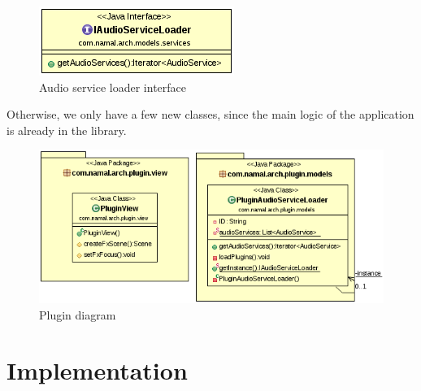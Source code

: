 \documentclass{report}
\begin{document}
{\begin{center}
\begin{figure}[H]
  \includegraphics[scale=0.4]{class/AudioServiceLoader.png}
  \caption{Audio service loader interface}
  \label{AudioServiceLoader}
\end{figure}
\end{center}

Otherwise, we only have a few new classes, since the main logic of the application is already in the library. 

\begin{center}
\begin{figure}[H]

  \includegraphics[scale=0.4]{class/Plugin.png}
  \caption{Plugin diagram}
  \label{Plugin}
\end{figure}
\end{center}
}

\chapter{Implementation}
\end{document}
